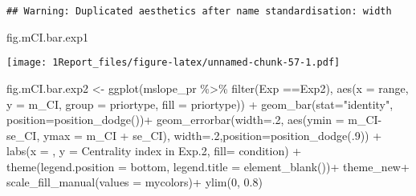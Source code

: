 \documentclass[
]{article}
\newenvironment{Shaded}{\begin{snugshade}}{\end{snugshade}}
\newcommand{\AttributeTok}[1]{\textcolor[rgb]{0.77,0.63,0.00}{#1}}
\newcommand{\DecValTok}[1]{\textcolor[rgb]{0.00,0.00,0.81}{#1}}
\newcommand{\FloatTok}[1]{\textcolor[rgb]{0.00,0.00,0.81}{#1}}
\newcommand{\FunctionTok}[1]{\textcolor[rgb]{0.00,0.00,0.00}{#1}}
\newcommand{\NormalTok}[1]{#1}
\newcommand{\OtherTok}[1]{\textcolor[rgb]{0.56,0.35,0.01}{#1}}
\newcommand{\SpecialCharTok}[1]{\textcolor[rgb]{0.00,0.00,0.00}{#1}}
\newcommand{\StringTok}[1]{\textcolor[rgb]{0.31,0.60,0.02}{#1}}
\begin{document}
\begin{verbatim}
## Warning: Duplicated aesthetics after name standardisation: width
\end{verbatim}

\begin{Shaded}
\begin{Highlighting}[]
\NormalTok{fig.mCI.bar.exp1}
\end{Highlighting}
\end{Shaded}

\texttt{[image: 1Report\_files/figure-latex/unnamed-chunk-57-1.pdf]}

\begin{Shaded}
\begin{Highlighting}[]
\NormalTok{fig.mCI.bar.exp2 }\OtherTok{\textless{}{-}} \FunctionTok{ggplot}\NormalTok{(mslope\_pr }\SpecialCharTok{\%\textgreater{}\%} \FunctionTok{filter}\NormalTok{(Exp }\SpecialCharTok{==}\StringTok{\textquotesingle{}Exp2\textquotesingle{}}\NormalTok{), }\FunctionTok{aes}\NormalTok{(}\AttributeTok{x =}\NormalTok{ range, }\AttributeTok{y =}\NormalTok{ m\_CI, }\AttributeTok{group =}\NormalTok{ priortype, }\AttributeTok{fill =}\NormalTok{ priortype)) }\SpecialCharTok{+} 
  \FunctionTok{geom\_bar}\NormalTok{(}\AttributeTok{stat=}\StringTok{"identity"}\NormalTok{, }\AttributeTok{position=}\FunctionTok{position\_dodge}\NormalTok{())}\SpecialCharTok{+}
  \FunctionTok{geom\_errorbar}\NormalTok{(}\AttributeTok{width=}\NormalTok{.}\DecValTok{2}\NormalTok{, }\FunctionTok{aes}\NormalTok{(}\AttributeTok{ymin =}\NormalTok{ m\_CI}\SpecialCharTok{{-}}\NormalTok{ se\_CI, }\AttributeTok{ymax =}\NormalTok{ m\_CI }\SpecialCharTok{+}\NormalTok{ se\_CI), }\AttributeTok{width=}\NormalTok{.}\DecValTok{2}\NormalTok{,}\AttributeTok{position=}\FunctionTok{position\_dodge}\NormalTok{(.}\DecValTok{9}\NormalTok{)) }\SpecialCharTok{+}
  \FunctionTok{labs}\NormalTok{(}\AttributeTok{x =} \StringTok{\textquotesingle{} \textquotesingle{}}\NormalTok{, }\AttributeTok{y =} \StringTok{\textquotesingle{}Centrality index in Exp.2\textquotesingle{}}\NormalTok{, }\AttributeTok{fill=} \StringTok{\textquotesingle{}condition\textquotesingle{}}\NormalTok{) }\SpecialCharTok{+}
  \FunctionTok{theme}\NormalTok{(}\AttributeTok{legend.position =} \StringTok{\textquotesingle{}bottom\textquotesingle{}}\NormalTok{, }\AttributeTok{legend.title =} \FunctionTok{element\_blank}\NormalTok{())}\SpecialCharTok{+}
\NormalTok{  theme\_new}\SpecialCharTok{+}
  \FunctionTok{scale\_fill\_manual}\NormalTok{(}\AttributeTok{values =}\NormalTok{ mycolors)}\SpecialCharTok{+}
  \FunctionTok{ylim}\NormalTok{(}\DecValTok{0}\NormalTok{, }\FloatTok{0.8}\NormalTok{)}
\end{Highlighting}
\end{Shaded}
\end{document}
